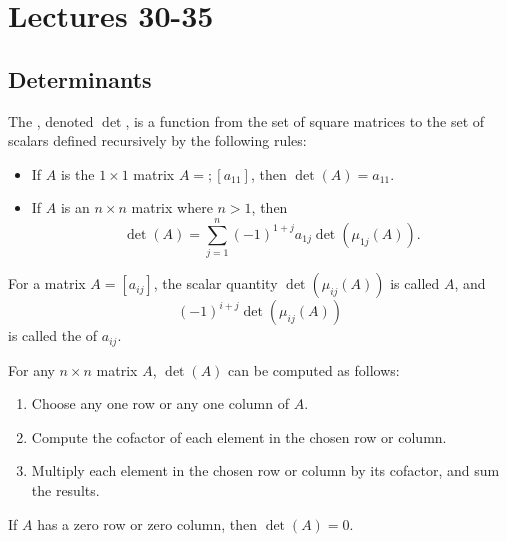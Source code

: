 \section{Lectures 30-35}
\subsection{Determinants}
\begin{definition}
  The , denoted $\det$, is a function from the set of square matrices to the set of scalars defined recursively by the following rules:
  \begin{itemize}
    \item If $A$ is the $1 \times 1$ matrix $A = ;[a_{11}]$, then $\det(A) = a_{11}$.
    \item If $A$ is an $n \times n$ matrix where $n > 1$, then
      \begin{equation*}
        \det(A) = \sum^{n}_{j = 1} (-1)^{1 + j} a_{1j} \det(\mu_{1j}(A)).
      \end{equation*}
  \end{itemize}
\end{definition}

\begin{definition}
  For a matrix $A = \left[a_{ij}\right]$, the scalar quantity $\det(\mu_{ij}(A))$ is called  $A$, and 
  \begin{equation*}
    (-1)^{i + j} \det(\mu_{ij}(A)) 
  \end{equation*}
  is called the  of $a_{ij}$.
\end{definition}

\begin{theorem}
  For any $n \times n$ matrix $A$, $\det(A)$ can be computed as follows:
  \begin{enumerate}[(1)]
    \item Choose any one row or any one column of $A$.
    \item Compute the cofactor of each element in the chosen row or column.
    \item Multiply each element in the chosen row or column by its cofactor, and sum the results.
  \end{enumerate}
\end{theorem}

\begin{corollary}
  If $A$ has a zero row or zero column, then $\det(A) = 0$.
\end{corollary}

